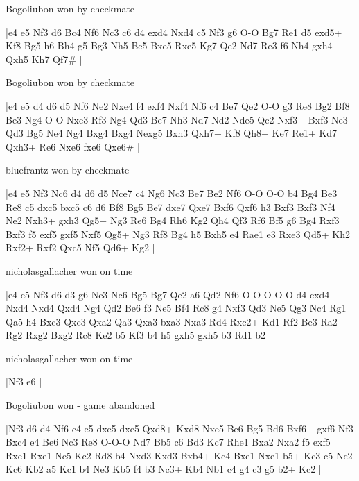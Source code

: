 \showboard

Bogoliubon won by checkmate

\makegametitle
|e4 e5 Nf3 d6 Bc4 Nf6 Nc3 c6 d4 exd4 Nxd4 c5 Nf3 g6 O-O Bg7 Re1 d5 exd5+ Kf8 Bg5 h6 Bh4 g5 Bg3 Nh5 Be5 Bxe5 Rxe5 Kg7 Qe2 Nd7 Re3 f6 Nh4 gxh4 Qxh5 Kh7 Qf7\#  |

\showboard

Bogoliubon won by checkmate

\makegametitle
|e4 e5 d4 d6 d5 Nf6 Ne2 Nxe4 f4 exf4 Nxf4 Nf6 c4 Be7 Qe2 O-O g3 Re8 Bg2 Bf8 Be3 Ng4 O-O Nxe3 Rf3 Ng4 Qd3 Be7 Nh3 Nd7 Nd2 Nde5 Qc2 Nxf3+ Bxf3 Ne3 Qd3 Bg5 Ne4 Ng4 Bxg4 Bxg4 Nexg5 Bxh3 Qxh7+ Kf8 Qh8+ Ke7 Re1+ Kd7 Qxh3+ Re6 Nxe6 fxe6 Qxe6\#  |

\showboard

bluefrantz won by checkmate

\makegametitle
|e4 e5 Nf3 Nc6 d4 d6 d5 Nce7 c4 Ng6 Nc3 Be7 Be2 Nf6 O-O O-O b4 Bg4 Be3 Re8 c5 dxc5 bxc5 c6 d6 Bf8 Bg5 Be7 dxe7 Qxe7 Bxf6 Qxf6 h3 Bxf3 Bxf3 Nf4 Ne2 Nxh3+ gxh3 Qg5+ Ng3 Re6 Bg4 Rh6 Kg2 Qh4 Qf3 Rf6 Bf5 g6 Bg4 Rxf3 Bxf3 f5 exf5 gxf5 Nxf5 Qg5+ Ng3 Rf8 Bg4 h5 Bxh5 e4 Rae1 e3 Rxe3 Qd5+ Kh2 Rxf2+ Rxf2 Qxc5 Nf5 Qd6+ Kg2  |

\showboard

nicholasgallacher won on time

\makegametitle
|e4 c5 Nf3 d6 d3 g6 Nc3 Nc6 Bg5 Bg7 Qe2 a6 Qd2 Nf6 O-O-O O-O d4 cxd4 Nxd4 Nxd4 Qxd4 Ng4 Qd2 Be6 f3 Ne5 Bf4 Rc8 g4 Nxf3 Qd3 Ne5 Qg3 Nc4 Rg1 Qa5 h4 Bxc3 Qxc3 Qxa2 Qa3 Qxa3 bxa3 Nxa3 Rd4 Rxc2+ Kd1 Rf2 Be3 Ra2 Rg2 Rxg2 Bxg2 Rc8 Ke2 b5 Kf3 b4 h5 gxh5 gxh5 b3 Rd1 b2  |

\showboard

nicholasgallacher won on time

\makegametitle
|Nf3 e6  |

\showboard

Bogoliubon won - game abandoned

\makegametitle
|Nf3 d6 d4 Nf6 c4 e5 dxe5 dxe5 Qxd8+ Kxd8 Nxe5 Be6 Bg5 Bd6 Bxf6+ gxf6 Nf3 Bxc4 e4 Be6 Nc3 Re8 O-O-O Nd7 Bb5 c6 Bd3 Kc7 Rhe1 Bxa2 Nxa2 f5 exf5 Rxe1 Rxe1 Nc5 Kc2 Rd8 b4 Nxd3 Kxd3 Bxb4+ Kc4 Bxe1 Nxe1 b5+ Kc3 c5 Nc2 Kc6 Kb2 a5 Kc1 b4 Ne3 Kb5 f4 b3 Nc3+ Kb4 Nb1 c4 g4 c3 g5 b2+ Kc2  |

